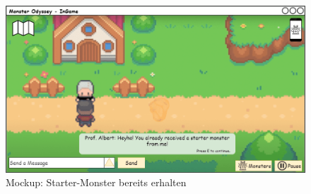 \begin{figure}[H]
    \center
    \includegraphics[scale=\scale]{images/mockups/Starter/PlayerAndProfAlreadyReceived}
    \caption{Mockup: Starter-Monster bereits erhalten}
    \label{fig: Starter-Monster bereits erhalten}
\end{figure}
